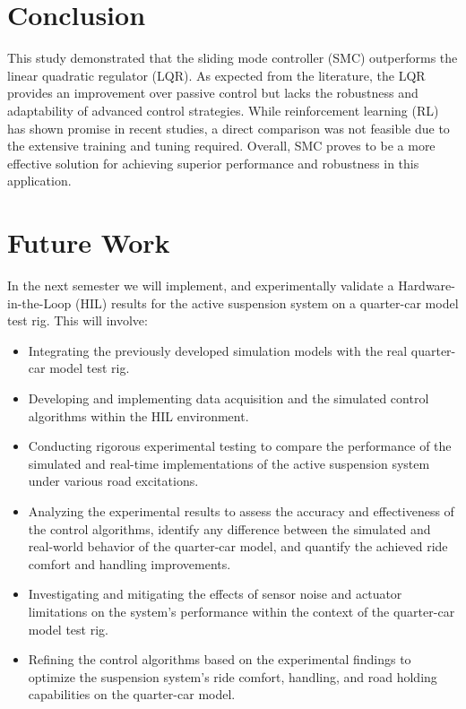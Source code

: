 \section{Conclusion}
This study demonstrated that the sliding mode controller (SMC) outperforms the linear quadratic regulator (LQR). As expected from the literature, the LQR provides an improvement over passive control but lacks the robustness and adaptability of advanced control strategies. While reinforcement learning (RL) has shown promise in recent studies, a direct comparison was not feasible due to the extensive training and tuning required. Overall, SMC proves to be a more effective solution for achieving superior performance and robustness in this application.


\section{Future Work}
In the next semester we  will implement, and experimentally validate a Hardware-in-the-Loop (HIL) results for the active suspension system on a quarter-car model test rig. This will involve:

\begin{itemize}
	\item Integrating the previously developed simulation models with the real quarter-car model test rig.
	\item Developing and implementing data acquisition and the simulated control algorithms within the HIL environment.
	\item Conducting rigorous experimental testing to compare the performance of the simulated and real-time implementations of the active suspension system under various road excitations.
	\item Analyzing the experimental results to assess the accuracy and effectiveness of the control algorithms, identify any difference between the simulated and real-world behavior of the quarter-car model, and quantify the achieved ride comfort and handling improvements.
	\item Investigating and mitigating the effects of sensor noise and actuator limitations on the system's performance within the context of the quarter-car model test rig.
	\item Refining the control algorithms based on the experimental findings to optimize the suspension system's ride comfort, handling, and road holding capabilities on the quarter-car model.
\end{itemize}